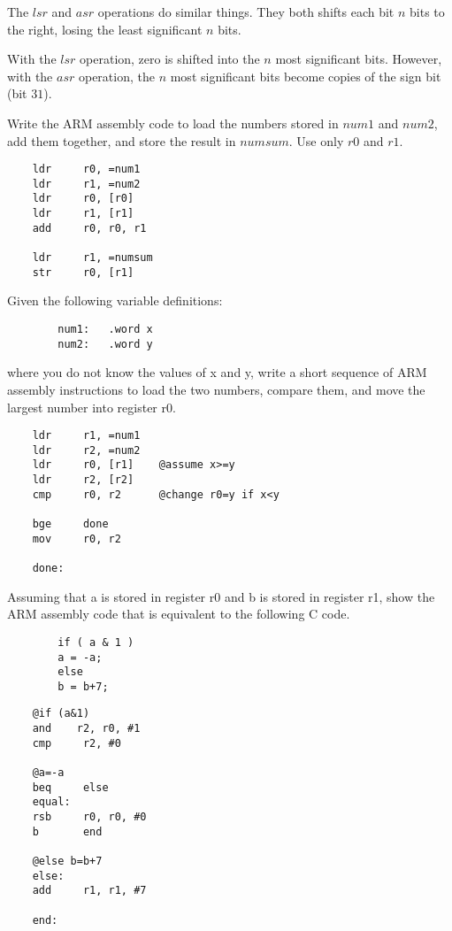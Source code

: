 \documentclass[12pt]{article}
\newenvironment{problem}[2][Problem]{\begin{trivlist}
\item[\hskip \labelsep {\bfseries #1}\hskip \labelsep {\bfseries #2.}]}{\end{trivlist}}
\begin{document}
The $lsr$ and $asr$ operations do similar things. They both shifts each bit $n$ bits to the right, losing the least significant $n$ bits.

With the $lsr$ operation, zero is shifted into the $n$ most significant bits.
However, with the $asr$ operation, the $n$ most significant bits become copies of the sign bit (bit $31$).


\begin{problem}{4.4}
    Write the ARM assembly code to load the numbers stored in $num1$ and $num2$, add them together, and store the result in $numsum$. Use only $r0$ and $r1$.
\end{problem}

\begin{verbatim}
    ldr     r0, =num1
    ldr     r1, =num2
    ldr     r0, [r0]
    ldr     r1, [r1]
    add     r0, r0, r1
    
    ldr     r1, =numsum
    str     r0, [r1]
\end{verbatim}


\begin{problem}{4.5}
    Given the following variable definitions:
    \begin{verbatim}
        num1:   .word x
        num2:   .word y
    \end{verbatim}
    where you do not know the values of x and y, write a short sequence of ARM assembly instructions to load the two numbers, compare them, and move the largest number into register r0.
\end{problem}

\begin{verbatim}
    ldr     r1, =num1
    ldr     r2, =num2
    ldr     r0, [r1]    @assume x>=y
    ldr     r2, [r2]
    cmp     r0, r2      @change r0=y if x<y

    bge     done
    mov     r0, r2

    done:
\end{verbatim}


\begin{problem}{4.6}
    Assuming that a is stored in register r0 and b is stored in register r1, show the ARM assembly code that is equivalent to the following C code.
    \begin{verbatim}
        if ( a & 1 )
        a = -a;
        else
        b = b+7;
    \end{verbatim}

\end{problem}

\begin{verbatim}
    @if (a&1)
    and    r2, r0, #1  
    cmp     r2, #0

    @a=-a
    beq     else
    equal:
    rsb     r0, r0, #0
    b       end

    @else b=b+7
    else:
    add     r1, r1, #7  

    end:
\end{verbatim}
\end{document}
